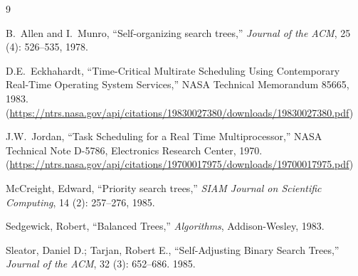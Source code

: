 \documentclass{article}
\begin{document}

\begin{thebibliography}{9}

B.\ Allen and I.\ Munro, ``Self-organizing search trees,'' {\em Journal of the ACM}, 25 (4): 526–535, 1978.

D.E.\ Eckhahardt, ``Time-Critical Multirate Scheduling Using Contemporary Real-Time Operating System Services,''
NASA Technical Memorandum 85665, 1983.
(\url{https://ntrs.nasa.gov/api/citations/19830027380/downloads/19830027380.pdf})

J.W.\ Jordan, ``Task Scheduling for a Real Time Multiprocessor,'' NASA Technical Note D-5786, Electronics Research Center, 1970.
(\url{https://ntrs.nasa.gov/api/citations/19700017975/downloads/19700017975.pdf})

McCreight, Edward, ``Priority search trees,'' {\em SIAM Journal on Scientific Computing}, 14 (2): 257–276, 1985.

Sedgewick, Robert, ``Balanced Trees,'' {\em Algorithms}, Addison-Wesley, 1983.

Sleator, Daniel D.; Tarjan, Robert E., ``Self-Adjusting Binary Search Trees,'' {\em Journal of the ACM}, 32 (3): 652–686. 1985.

\end{thebibliography}
\end{document}
